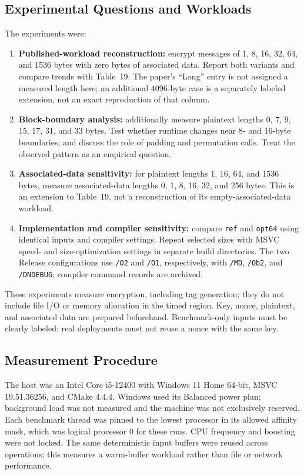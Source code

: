 \documentclass[conference]{IEEEtran}
\begin{document}
\subsection{Experimental Questions and Workloads}
The experiments were:
\begin{enumerate}
  \item \textbf{Published-workload reconstruction:} encrypt messages of 1, 8,
  16, 32, 64, and 1536 bytes with zero bytes of associated data. Report both
  variants and compare trends with Table~19. The paper's ``Long'' entry is
  not assigned a measured length here; an additional 4096-byte case is a
  separately labeled extension, not an exact reproduction of that column.
  \item \textbf{Block-boundary analysis:} additionally measure plaintext
  lengths 0, 7, 9, 15, 17, 31, and 33 bytes. Test whether runtime changes near
  8- and 16-byte boundaries, and discuss the role of padding and permutation
  calls. Treat the observed pattern as an empirical question.
  \item \textbf{Associated-data sensitivity:} for plaintext lengths 1, 16,
  64, and 1536 bytes, measure associated-data lengths 0, 1, 8, 16, 32, and
  256 bytes. This is an extension to Table~19, not a reconstruction of its
  empty-associated-data workload.
  \item \textbf{Implementation and compiler sensitivity:} compare
  \texttt{ref} and \texttt{opt64} using identical inputs and compiler settings.
  Repeat selected   sizes with MSVC speed- and size-optimization settings in separate build
  directories. The two Release configurations use \texttt{/O2} and
  \texttt{/O1}, respectively, with \texttt{/MD}, \texttt{/Ob2}, and
  \texttt{/DNDEBUG}; compiler command records are archived.
\end{enumerate}

These experiments measure encryption, including tag generation; they do not
include file I/O or memory allocation in the timed region. Key, nonce,
plaintext, and associated data are prepared beforehand. Benchmark-only inputs
must be clearly labeled: real deployments must not reuse a nonce with the
same key.

\subsection{Measurement Procedure}
The host was an Intel Core i5-12400 with Windows 11 Home 64-bit, MSVC
19.51.36256, and CMake 4.4.4. Windows used its Balanced power plan; background
load was not measured and the machine was not exclusively reserved. Each
benchmark thread was pinned to the lowest processor in its allowed affinity
mask, which was logical processor 0 for these runs. CPU frequency and boosting
were not locked. The same deterministic input buffers were reused across
operations; this measures a warm-buffer workload rather than file or network
performance.
\end{document}
